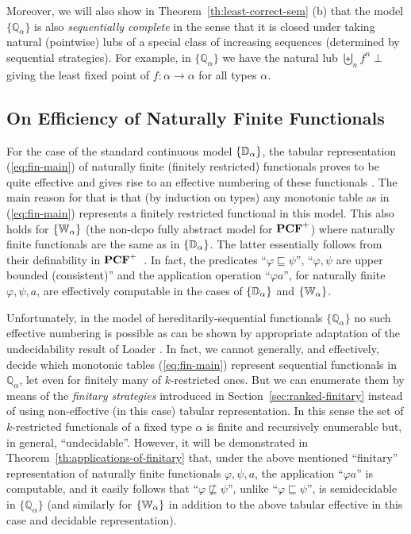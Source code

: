 \documentclass[fleqn]{LMCS}
\theoremstyle{plain}\newtheorem{satz}[thm]{Satz}
\theoremstyle{plain}\newtheorem{hyp}[thm]{Hypothesis}
\theoremstyle{plain}\newtheorem{hyps}[thm]{Hypotheses}
\theoremstyle{definition}\newtheorem{note}[thm]{Note}
\newcommand{\setof}[1]{\{#1\}}
\newcommand{\pointwiselub}{\biguplus}
\newcommand{\arr}{\rightarrow}
\newcommand{\bbQ}{\mathbb{Q}}
\newcommand{\PCF}{\mbox{\bf PCF}}
\newcommand{\Undef}{{\perp}}
\newcommand{\?}{\mbox{?}}
\begin{document}
Moreover, we will also show in Theorem~\ref{th:least-correct-sem} (b) 
that the model $\setof{\bbQ_\alpha}$ 
is also \emph{sequentially complete} in the sense that it is closed 
under taking natural (pointwise) lubs of a special class of increasing 
sequences (determined by sequential strategies). 
For example, in $\setof{\bbQ_\alpha}$ we have the natural lub 
$\pointwiselub_n f^n \Undef$ giving the least fixed point of $f:\alpha\arr\alpha$ 
for all types $\alpha$. 

\subsection{On Efficiency of Naturally Finite Functionals}
\label{sec:efficiency}


For the case of the standard continuous model $\setof{\bbD_\alpha}$,
the tabular representation (\ref{eq:fin-main}) of naturally finite 
(finitely restricted) functionals proves to be quite effective and 
gives rise to an effective numbering 
of these functionals \cite{Ershov72}. The main reason for that is that 
(by induction on types)
any monotonic table as in (\ref{eq:fin-main}) represents a finitely restricted 
functional in this model. This also holds 
for $\setof{\bbW_\alpha}$ (the non-dcpo fully abstract model for $\PCF^+$) 
where naturally finite functionals are the same as in $\setof{\bbD_\alpha}$. 
The latter essentially follows from 
their definability in $\PCF^+$~\cite{Plotkin77}. In fact, the predicates 
``$\varphi\sqsubseteq\psi$'', ``$\varphi,\psi$ are upper bounded (consistent)'' 
and the application operation ``$\varphi a$'', for naturally finite $\varphi,\psi,a$, 
are effectively computable in the cases of $\setof{\bbD_\alpha}$ and $\setof{\bbW_\alpha}$. 


Unfortunately, in the model of hereditarily-sequential functionals 
$\setof{\bbQ_\alpha}$ no such effective numbering is possible as can be shown 
by appropriate adaptation of the undecidability result of Loader \cite{LoaderTCS2001}. 
In fact, we cannot generally, and effectively, decide which monotonic 
tables (\ref{eq:fin-main}) represent sequential functionals in $\bbQ_\alpha$, 
let even for finitely many of $k$-restricted ones. 
But we can enumerate them 
by means of the \emph{finitary strategies} introduced in Section~\ref{sec:ranked-finitary} 
instead of using non-effective (in this case) tabular representation. 
In this sense the set of $k$-restricted 
functionals of a fixed type $\alpha$ is finite and recursively enumerable but, 
in general, ``undecidable''. 
However, it will be demonstrated in Theorem~\ref{th:applications-of-finitary} that, 
under the above mentioned ``finitary'' representation of naturally finite functionals 
$\varphi,\psi, a$, 
the application ``$\varphi a$'' is computable, and it easily follows that 
``$\varphi\not\sqsubseteq\psi$'', 
unlike ``$\varphi\sqsubseteq\psi$'', is semidecidable 
in $\setof{\bbQ_\alpha}$ 
(and similarly for $\setof{\bbW_\alpha}$ in addition to the above tabular 
effective in this case and decidable representation). 
\end{document}

